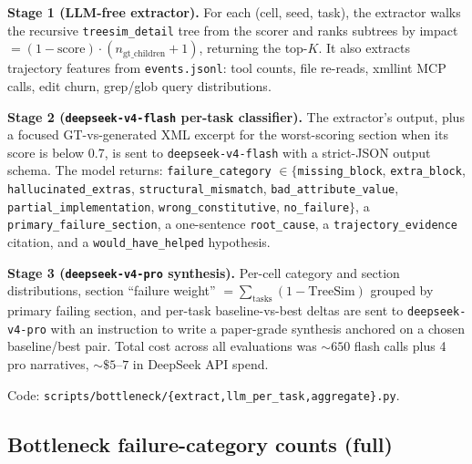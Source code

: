 \documentclass{article}
\begin{document}
\textbf{Stage 1 (LLM-free extractor).} For each (cell, seed, task), the extractor walks the recursive \texttt{treesim\_detail} tree from the scorer and ranks subtrees by impact $= (1 - \mathrm{score}) \cdot (n_{\mathrm{gt\_children}} + 1)$, returning the top-$K$. It also extracts trajectory features from \texttt{events.jsonl}: tool counts, file re-reads, xmllint MCP calls, edit churn, grep/glob query distributions.

\textbf{Stage 2 (\texttt{deepseek-v4-flash} per-task classifier).} The extractor's output, plus a focused GT-vs-generated XML excerpt for the worst-scoring section when its score is below 0.7, is sent to \texttt{deepseek-v4-flash} with a strict-JSON output schema. The model returns: \texttt{failure\_category} $\in \{$\texttt{missing\_block}, \texttt{extra\_block}, \texttt{hallucinated\_extras}, \texttt{structural\_mismatch}, \texttt{bad\_attribute\_value}, \texttt{partial\_implementation}, \texttt{wrong\_constitutive}, \texttt{no\_failure}$\}$, a \texttt{primary\_failure\_section}, a one-sentence \texttt{root\_cause}, a \texttt{trajectory\_evidence} citation, and a \texttt{would\_have\_helped} hypothesis.

\textbf{Stage 3 (\texttt{deepseek-v4-pro} synthesis).} Per-cell category and section distributions, section ``failure weight'' $= \sum_{\mathrm{tasks}}(1 - \mathrm{TreeSim})$ grouped by primary failing section, and per-task baseline-vs-best deltas are sent to \texttt{deepseek-v4-pro} with an instruction to write a paper-grade synthesis anchored on a chosen baseline/best pair. Total cost across all evaluations was ${\sim}650$ flash calls plus 4 pro narratives, ${\sim}\$5\text{--}7$ in DeepSeek API spend.

Code: \texttt{scripts/bottleneck/\{extract,llm\_per\_task,aggregate\}.py}.

\subsection{Bottleneck failure-category counts (full)}
\label{app:bottleneck-counts}
\end{document}
